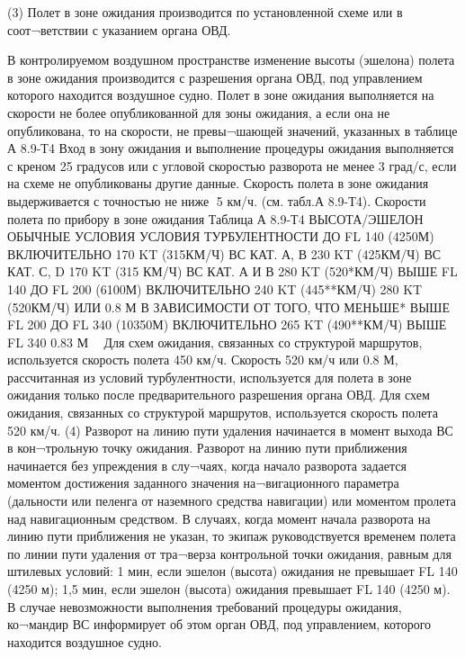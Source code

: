        (3) Полет в зоне ожидания производится по установленной схеме или в соот¬ветствии с указанием органа ОВД.

 
В контролируемом воздушном пространстве изменение высоты (эшелона) полета в зоне ожидания производится с разрешения органа ОВД, под управлением которого находится воздушное судно. 
Полет в зоне ожидания выполняется на скорости не более опубликованной для зоны ожидания, а если она не опубликована, то на скорости, не превы¬шающей значений, указанных в таблице А 8.9-Т4
Вход в зону ожидания и выполнение процедуры ожидания выполняется с креном 25 градусов или с угловой скоростью разворота не менее 3 град/с, если на схеме не опубликованы другие данные.
Скорость полета в зоне ожидания выдерживается с точностью не ниже 5 км/ч. (см. табл.А 8.9-Т4).
Скорости полета по прибору в зоне ожидания
                                                                                                                                          Таблица А 8.9-Т4
ВЫСОТА/ЭШЕЛОН	ОБЫЧНЫЕ УСЛОВИЯ	УСЛОВИЯ ТУРБУЛЕНТНОСТИ
ДО FL 140 (4250М) 
ВКЛЮЧИТЕЛЬНО	170 KT (315КМ/Ч) ВС КАТ. А, В
230 KT (425КМ/Ч) ВС КАТ. С, D	170 KT (315 КМ/Ч) ВС КАТ. А И В
280 KT (520*КМ/Ч)
ВЫШЕ FL 140 ДО FL 200 (6100М) ВКЛЮЧИТЕЛЬНО	240 KT (445**КМ/Ч)	
280 KT (520КМ/Ч) ИЛИ 0.8 М
В ЗАВИСИМОСТИ ОТ ТОГО, ЧТО МЕНЬШЕ*
ВЫШЕ FL 200 ДО FL 340 (10350М) ВКЛЮЧИТЕЛЬНО	265 KT (490**КМ/Ч)	
ВЫШЕ FL 340	0.83 М
 Для схем ожидания, связанных со структурой маршрутов, используется скорость полета 450 км/ч.
Скорость 520 км/ч или 0.8 М, рассчитанная из условий турбулентности, используется для полета в зоне ожидания только после предварительного разрешения органа ОВД.
Для схем ожидания, связанных со структурой маршрутов, используется скорость полета 520 км/ч.
(4) Разворот на линию пути удаления начинается в момент выхода ВС в кон¬трольную точку ожидания. 
Разворот на линию пути приближения начинается без упреждения в слу¬чаях, когда начало разворота задается моментом достижения заданного значения на¬вигационного параметра (дальности или пеленга от наземного средства навигации) или моментом пролета над навигационным средством. 
В случаях, когда момент начала разворота на линию пути приближения не указан, то экипаж руководствуется временем полета по линии пути удаления от тра¬верза контрольной точки ожидания, равным для штилевых условий:
1 мин, если эшелон (высота) ожидания не превышает FL 140 (4250 м);
1,5 мин, если эшелон (высота) ожидания превышает FL 140 (4250 м).
В случае невозможности выполнения требований процедуры ожидания, ко¬мандир ВС информирует об этом орган ОВД, под управлением, которого находится воздушное судно.
